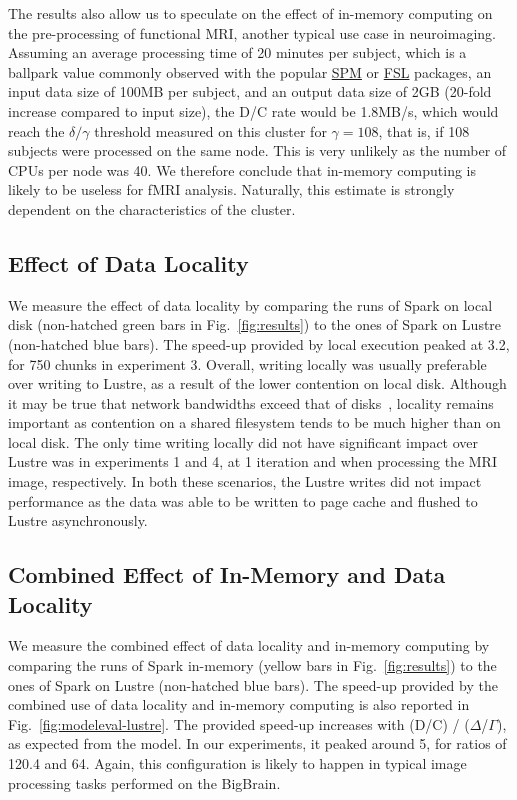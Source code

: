 The results also allow us to speculate on the effect of in-memory 
computing on the pre-processing of functional MRI, another typical use 
case in neuroimaging. Assuming an average processing time of 20 minutes 
per subject, which is a ballpark value commonly observed with the 
popular \href{https://www.fil.ion.ucl.ac.uk/spm/}{SPM} or \href{https://fsl.fmrib.ox.ac.uk/fsl/fslwiki/}{FSL} packages,
an input data size of 100MB per subject, 
and an output data size of 2GB (20-fold increase compared to input 
size), the D/C rate would be 1.8MB/s, which would reach the 
$\delta/\gamma$ threshold measured on this cluster for $\gamma=108$, 
that is, if 108 subjects were processed on the same node. This is very 
unlikely as the number of CPUs per node was 40. We therefore conclude 
that in-memory computing is likely to be useless for fMRI analysis.
Naturally, this estimate is strongly dependent on the characteristics of the cluster.

\subsection{Effect of Data Locality}

We measure the effect of data locality by comparing the runs of Spark
on local disk (non-hatched green bars in Fig.~\ref{fig:results}) to the 
ones of Spark on Lustre (non-hatched blue bars). The speed-up provided by 
local execution peaked at 3.2, for 750 chunks in experiment 3. Overall, 
writing locally was usually preferable over writing to Lustre, as a result of the
lower contention on local disk. Although it may be true that
network bandwidths exceed that of disks~\cite{ananthanarayanan2011disk},
locality remains important 
as contention on a shared filesystem tends to be much higher than on local disk.
The only time writing locally did not
have significant impact over Lustre was in experiments 1 and 4, at 1 iteration and 
when processing the MRI image, respectively. In both these scenarios, the Lustre 
writes did not impact performance as the data was able to be written to page cache
and flushed to Lustre asynchronously.

\subsection{Combined Effect of In-Memory and Data Locality}
We measure the combined effect of data locality and in-memory computing 
by comparing the runs of Spark in-memory (yellow bars in 
Fig.~\ref{fig:results}) to the ones of Spark on Lustre (non-hatched 
blue bars). The speed-up provided by the combined use of data locality 
and in-memory computing is also reported in 
Fig.~\ref{fig:modeleval-lustre}. The provided speed-up increases with 
(D/C) / ($\Delta$/$\Gamma$), as expected from the model. In our 
experiments, it peaked around 5, for ratios of 120.4 and 64. Again, 
this configuration is likely to happen in typical image processing 
tasks performed on the BigBrain.

